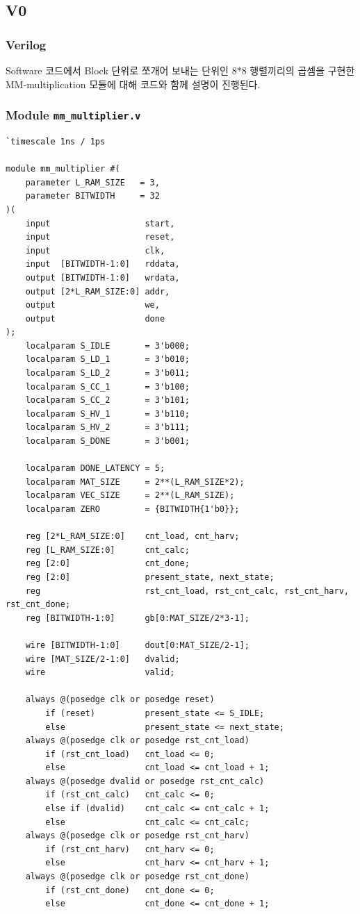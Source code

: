 \documentclass{article}
\begin{document}
\subsection{V0}

\subsubsection{Verilog}
Software 코드에서 Block 단위로 쪼개어 보내는 단위인 8*8 행렬끼리의 곱셈을 구현한 MM-multiplication 모듈에 대해 코드와 함께 설명이 진행된다.

\subsubsection*{Module \texttt{mm\_multiplier.v}}
\label{sec:mm_mul}
\begin{lstlisting}[style={verilog-style}]
`timescale 1ns / 1ps

module mm_multiplier #(
    parameter L_RAM_SIZE   = 3,
    parameter BITWIDTH     = 32
)(
    input                   start,
    input                   reset,
    input                   clk,
    input  [BITWIDTH-1:0]   rddata,
    output [BITWIDTH-1:0]   wrdata,
    output [2*L_RAM_SIZE:0] addr,
    output                  we,
    output                  done
);
    localparam S_IDLE       = 3'b000;
    localparam S_LD_1       = 3'b010;
    localparam S_LD_2       = 3'b011;
    localparam S_CC_1       = 3'b100;
    localparam S_CC_2       = 3'b101;
    localparam S_HV_1       = 3'b110;
    localparam S_HV_2       = 3'b111;
    localparam S_DONE       = 3'b001;
    
    localparam DONE_LATENCY = 5;
    localparam MAT_SIZE     = 2**(L_RAM_SIZE*2);
    localparam VEC_SIZE     = 2**(L_RAM_SIZE);
    localparam ZERO         = {BITWIDTH{1'b0}};
    
    reg [2*L_RAM_SIZE:0]    cnt_load, cnt_harv;
    reg [L_RAM_SIZE:0]      cnt_calc;
    reg [2:0]               cnt_done;
    reg [2:0]               present_state, next_state;
    reg                     rst_cnt_load, rst_cnt_calc, rst_cnt_harv, rst_cnt_done;
    reg [BITWIDTH-1:0]      gb[0:MAT_SIZE/2*3-1];
    
    wire [BITWIDTH-1:0]     dout[0:MAT_SIZE/2-1];
    wire [MAT_SIZE/2-1:0]   dvalid;
    wire                    valid;
    
    always @(posedge clk or posedge reset)
        if (reset)          present_state <= S_IDLE; 
        else                present_state <= next_state;
    always @(posedge clk or posedge rst_cnt_load) 
        if (rst_cnt_load)   cnt_load <= 0; 
        else                cnt_load <= cnt_load + 1;
    always @(posedge dvalid or posedge rst_cnt_calc) 
        if (rst_cnt_calc)   cnt_calc <= 0;
        else if (dvalid)    cnt_calc <= cnt_calc + 1;
        else                cnt_calc <= cnt_calc;
    always @(posedge clk or posedge rst_cnt_harv) 
        if (rst_cnt_harv)   cnt_harv <= 0; 
        else                cnt_harv <= cnt_harv + 1;
    always @(posedge clk or posedge rst_cnt_done) 
        if (rst_cnt_done)   cnt_done <= 0; 
        else                cnt_done <= cnt_done + 1;
    

\end{lstlisting}
\end{document}
